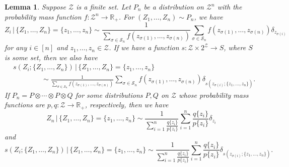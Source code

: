 \documentclass[11pt,letterpaper]{article}
\newtheorem{lemma}{Lemma} %
\theoremstyle{definition}
\newcommand{\cS}{\mathcal{S}}
\newcommand{\cZ}{\mathcal{Z}}
\newcommand{\R}{\mathbb{R}}
\begin{document}
\begin{lemma}
    \label{lem:conditional_distribution_permutation}
    Suppose $\cZ$ is a finite set. Let $P_n$ be a distribution on $\cZ^n$ with the probability mass function $f \colon \cZ^n \to \R_+$. For $(Z_1, \ldots, Z_n) \sim P_n$, we have 
    \begin{equation*}
        Z_i \, | \, \{Z_1, \ldots, Z_n\} = \{z_1, \ldots, z_n\} \sim \frac{1}{\sum_{\sigma \in \cS_n} f(z_{\sigma(1)}, \ldots, z_{\sigma(n)})} \sum_{\sigma \in \cS_n} f(z_{\sigma(1)}, \ldots, z_{\sigma(n)}) \delta_{z_{\sigma(i)}}
    \end{equation*}
    for any $i \in [n]$ and $z_1, \ldots, z_n \in \cZ$. If we have a function $s \colon \cZ \times 2^\cZ \to S$, where $S$ is some set, then we also have
    \begin{equation*}
        \begin{split}
            & s(Z_i; \{Z_1, \ldots, Z_n\}) \, | \, \{Z_1, \ldots, Z_n\} = \{z_1, \ldots, z_n\} \\
            & \qquad \qquad \sim \frac{1}{\sum_{\sigma \in \cS_n} f(z_{\sigma(1)}, \ldots, z_{\sigma(n)})} \sum_{\sigma \in \cS_n} f(z_{\sigma(1)}, \ldots, z_{\sigma(n)}) \delta_{s(z_{\sigma(i)}; \{z_1, \ldots, z_n\})}.
        \end{split}
    \end{equation*}
    If $P_n = P \otimes \cdots \otimes P \otimes Q$ for some distributions $P, Q$ on $\cZ$ whose probability mass functions are $p, q \colon \cZ \to \R_+$, respectively, then
     we have 
    \begin{equation*}
        Z_n \, | \, \{Z_1, \ldots, Z_n\} = \{z_1, \ldots, z_n\} \sim \frac{1}{\sum_{i = 1}^{n} \frac{q\{z_i\}}{p\{z_i\}}} \sum_{i = 1}^{n} \frac{q\{z_i\}}{p\{z_i\}} \delta_{z_i}
    \end{equation*}
    and 
    \begin{equation*}
        s(Z_i; \{Z_1, \ldots, Z_n\}) \, | \, \{Z_1, \ldots, Z_n\} = \{z_1, \ldots, z_n\} \sim \frac{1}{\sum_{i = 1}^{n} \frac{q\{z_i\}}{p\{z_i\}}} \sum_{i = 1}^{n} \frac{q\{z_i\}}{p\{z_i\}} \delta_{s(z_{\sigma(i)}; \{z_1, \ldots, z_n\})}.
    \end{equation*}
\end{lemma}
\end{document}
